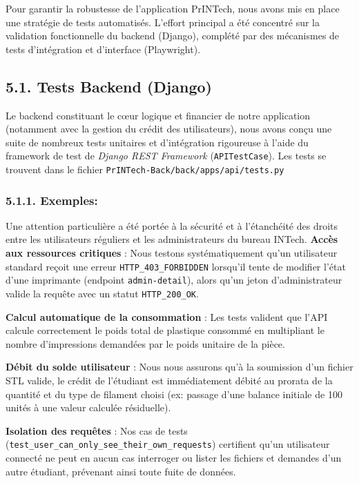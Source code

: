 Pour garantir la robustesse de l'application PrINTech, nous avons mis en
place une stratégie de tests automatisés. L'effort principal a été
concentré sur la validation fonctionnelle du backend (Django), complété
par des mécanismes de tests d'intégration et d'interface (Playwright).

\hypertarget{tests-backend-django}{%
\subsection{5.1. Tests Backend (Django)}\label{tests-backend-django}}

Le backend constituant le cœur logique et financier de notre application
(notamment avec la gestion du crédit des utilisateurs), nous avons conçu
une suite de nombreux tests unitaires et d'intégration rigoureuse à
l'aide du framework de test de \emph{Django REST Framework}
(\texttt{APITestCase}). Les tests se trouvent dans le fichier
\texttt{PrINTech-Back/back/apps/api/tests.py}

\hypertarget{exemples}{%
\subsubsection{5.1.1. Exemples:}\label{exemples}}

Une attention particulière a été portée à la sécurité et à l'étanchéité
des droits entre les utilisateurs réguliers et les administrateurs du
bureau INTech. \textbf{Accès aux ressources critiques} : Nous testons
systématiquement qu'un utilisateur standard reçoit une erreur
\texttt{HTTP\_403\_FORBIDDEN} lorsqu'il tente de modifier l'état d'une
imprimante (endpoint \texttt{admin-detail}), alors qu'un jeton
d'administrateur valide la requête avec un statut
\texttt{HTTP\_200\_OK}.

\textbf{Calcul automatique de la consommation} : Les tests valident que
l'API calcule correctement le poids total de plastique consommé en
multipliant le nombre d'impressions demandées par le poids unitaire de
la pièce.

\textbf{Débit du solde utilisateur} : Nous nous assurons qu'à la
soumission d'un fichier STL valide, le crédit de l'étudiant est
immédiatement débité au prorata de la quantité et du type de filament
choisi (ex: passage d'une balance initiale de 100 unités à une valeur
calculée résiduelle).

\textbf{Isolation des requêtes} : Nos cas de tests
(\texttt{test\_user\_can\_only\_see\_their\_own\_requests}) certifient
qu'un utilisateur connecté ne peut en aucun cas interroger ou lister les
fichiers et demandes d'un autre étudiant, prévenant ainsi toute fuite de
données.

